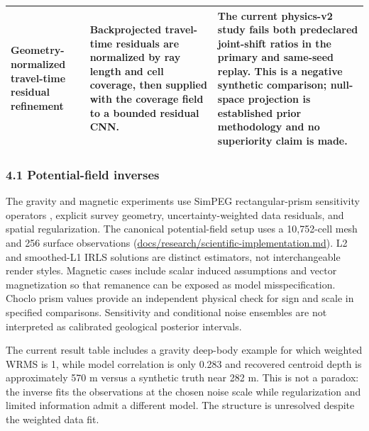 \begin{center}
\begin{longtable}{@{}>{\raggedright\arraybackslash}p{}>{\raggedright\arraybackslash}p{}>{\raggedright\arraybackslash}p{}@{}}
Geometry-normalized travel-time residual refinement & Backprojected travel-time residuals are normalized by ray length and cell coverage, then supplied with the coverage field to a bounded residual CNN. & The current physics-v2 study fails both predeclared joint-shift ratios in the primary and same-seed replay. This is a negative synthetic comparison; null-space projection is established prior methodology and no superiority claim is made. \\
\bottomrule
\end{longtable}
\end{center}



\subsubsection{4.1 Potential-field
inverses}\label{potential-field-inverses}

The gravity and magnetic experiments use SimPEG rectangular-prism
sensitivity operators \cite{cockett2015,heagy2017}, explicit survey
geometry, uncertainty-weighted data residuals, and spatial
regularization. The canonical potential-field setup uses a 10,752-cell
mesh and 256 surface observations
(\url{docs/research/scientific-implementation.md}). L2 and smoothed-L1
IRLS solutions are distinct estimators, not interchangeable render
styles. Magnetic cases include scalar induced assumptions and vector
magnetization so that remanence can be exposed as model
misspecification. Choclo prism values \cite{choclo} provide an
independent physical check for sign and scale in specified comparisons.
Sensitivity and conditional noise ensembles are not interpreted as
calibrated geological posterior intervals.

The current result table includes a gravity deep-body example for which
weighted WRMS is 1, while model correlation is only 0.283 and recovered
centroid depth is approximately 570 m versus a synthetic truth near 282
m. This is not a paradox: the inverse fits the observations at the
chosen noise scale while regularization and limited information admit a
different model. The structure is unresolved despite the weighted data
fit.

